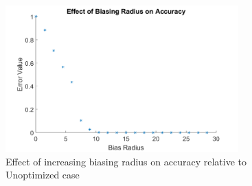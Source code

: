 \begin{figure}[H]
\centering
\includegraphics[width=0.8\textwidth]{Figures/RadiusBiasPositionErrors.png}
\caption{\label{fig:RadiusErrors} Effect of increasing biasing radius on accuracy relative to Unoptimized case}
\end{figure} 

